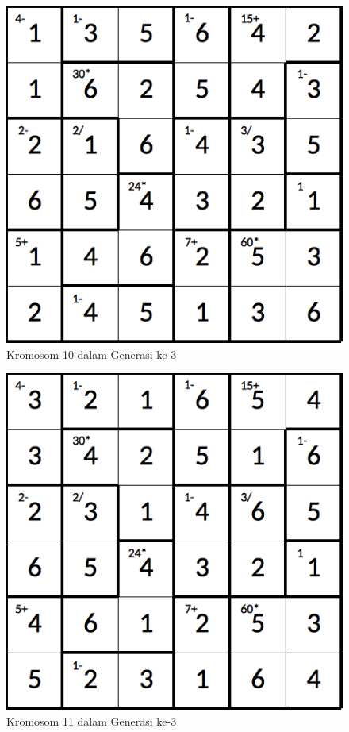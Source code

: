\begin{figure}
\centering
\captionsetup{justification=centering}
\includegraphics[scale=0.333]{Gambar/hybridgenetic/Generation3Chromosome10}
\caption[Kromosom 10 dalam Generasi ke-3]{Kromosom 10 dalam Generasi ke-3}
\label{fig:analisisg3k10}
\end{figure}

\begin{figure}
\centering
\captionsetup{justification=centering}
\includegraphics[scale=0.333]{Gambar/hybridgenetic/Generation3Chromosome11}
\caption[Kromosom 11 dalam Generasi ke-3]{Kromosom 11 dalam Generasi ke-3}
\label{fig:analisisg3k11}
\end{figure}

